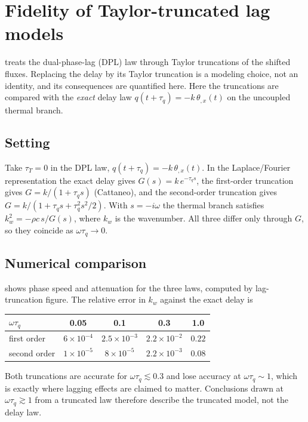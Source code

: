 \section{Fidelity of Taylor-truncated lag models}\label{sec:delayfid}

 treats the dual-phase-lag (DPL) law through Taylor truncations of the shifted fluxes. Replacing the delay by its Taylor truncation is a modeling choice, not an identity, and its consequences are quantified here. Here the truncations are compared with the \emph{exact} delay law $q(t+\tau_q)=-k\,\theta_{,x}(t)$ on the uncoupled thermal branch.

\subsection{Setting}
Take $\tau_T=0$ in the DPL law, $q(t+\tau_q)=-k\,\theta_{,x}(t)$. In the Laplace/Fourier representation the exact delay gives $G(s)=k\,e^{-\tau_q s}$, the first-order truncation gives $G=k/(1+\tau_q s)$ (Cattaneo), and the second-order truncation gives $G=k/(1+\tau_q s+\tau_q^2s^2/2)$. With $s=-i\omega$ the thermal branch satisfies $k_w^2=-\rho c\,s/G(s)$, where $k_w$ is the wavenumber. All three differ only through $G$, so they coincide as $\omega\tau_q\to0$.

\subsection{Numerical comparison}
 shows phase speed and attenuation for the three laws, computed by lag-truncation figure. The relative error in $k_w$ against the exact delay is
\begin{center}
\begin{tabular}{@{}lcccc@{}}
\toprule
$\omega\tau_q$ & 0.05 & 0.1 & 0.3 & 1.0\\
\midrule
first order & $6\times10^{-4}$ & $2.5\times10^{-3}$ & $2.2\times10^{-2}$ & $0.22$\\
second order & $1\times10^{-5}$ & $8\times10^{-5}$ & $2.2\times10^{-3}$ & $0.08$\\
\bottomrule
\end{tabular}
\end{center}
Both truncations are accurate for $\omega\tau_q\lesssim0.3$ and lose accuracy at $\omega\tau_q\sim1$, which is exactly where lagging effects are claimed to matter. Conclusions drawn at $\omega\tau_q\gtrsim1$ from a truncated law therefore describe the truncated model, not the delay law.

